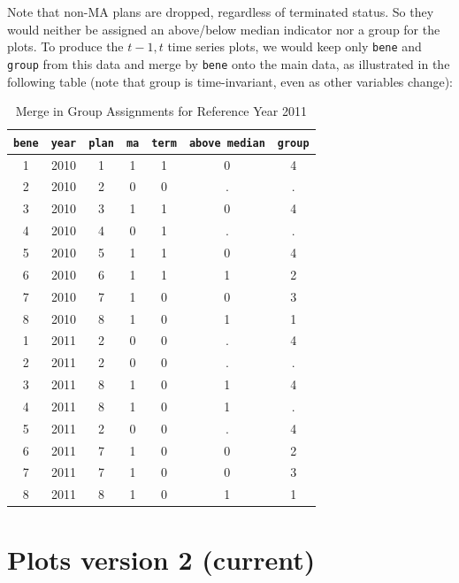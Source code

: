 \documentclass{article}
\begin{document}
Note that non-MA plans are dropped, regardless of terminated status.
So they would neither be assigned an above/below median indicator nor
a group for the plots. To produce the $t - 1, t$ time series plots, we
would keep only \verb`bene` and \verb`group` from this data and merge by
\verb`bene` onto the main data, as illustrated in the following table
(note that group is time-invariant, even as other variables change):
\begin{table}[H]
  \centering
  \caption{Merge in Group Assignments for Reference Year 2011}
  \label{tab:merge_in_group_assignments_for_reference_year_2011}
  \begin{tabular}{ccccccc}
  \toprule
    \verb`bene` & \verb`year` & \verb`plan` & \verb`ma` & \verb`term` & \verb`above median` & \verb`group` \\
    \midrule
    1 & 2010 & 1 & 1 & 1 & 0 & 4 \\
    2 & 2010 & 2 & 0 & 0 & . & . \\
    3 & 2010 & 3 & 1 & 1 & 0 & 4 \\
    4 & 2010 & 4 & 0 & 1 & . & . \\
    5 & 2010 & 5 & 1 & 1 & 0 & 4 \\
    6 & 2010 & 6 & 1 & 1 & 1 & 2 \\
    7 & 2010 & 7 & 1 & 0 & 0 & 3 \\
    8 & 2010 & 8 & 1 & 0 & 1 & 1 \\
    \midrule
    1 & 2011 & 2 & 0 & 0 & . & 4 \\
    2 & 2011 & 2 & 0 & 0 & . & . \\
    3 & 2011 & 8 & 1 & 0 & 1 & 4 \\
    4 & 2011 & 8 & 1 & 0 & 1 & . \\
    5 & 2011 & 2 & 0 & 0 & . & 4 \\
    6 & 2011 & 7 & 1 & 0 & 0 & 2 \\
    7 & 2011 & 7 & 1 & 0 & 0 & 3 \\
    8 & 2011 & 8 & 1 & 0 & 1 & 1 \\
  \bottomrule
  \end{tabular}
\end{table}

\section{Plots version 2 (current)}
\label{sec:plots_version_2_current_}
\end{document}
